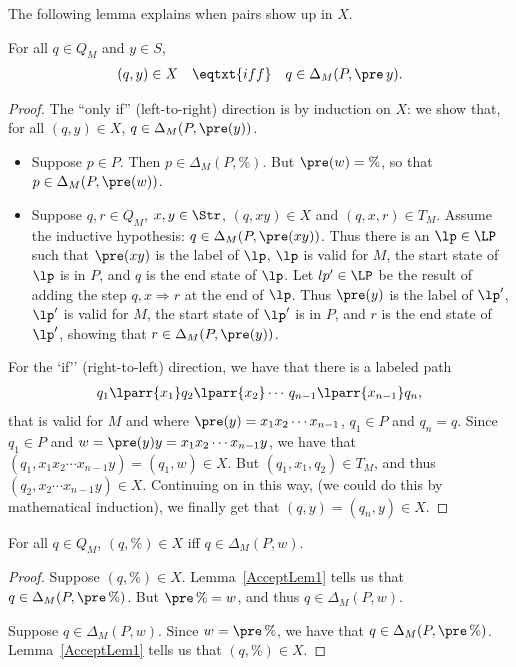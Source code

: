 The following lemma explains when pairs show up in $X$.

\begin{lemma}
\label{AcceptLem1}
For all $q\in Q_M$ and $y\in S$,
\begin{gather*}
(q,y)\in X\quad\eqtxt{iff}\quad q\in\Delta_M(P,\pre\,y) .
\end{gather*}
\end{lemma}

\begin{proof}
The ``only if'' (left-to-right) direction is by induction on $X$:
we show that, for all $(q,y)\in X$, $q\in\Delta_M(P,\pre(y))$.
\begin{itemize}
\item Suppose $p\in P$.  Then $p\in\Delta_M(P,\%)$.  But
$\pre(w)=\%$, so that $p\in\Delta_M(P,\pre(w))$.

\item Suppose $q,r\in Q_M$, $x,y\in\Str$, $(q,xy)\in X$ and
$(q,x,r)\in T_M$.  Assume the inductive hypothesis:
$q\in\Delta_M(P,\pre(xy))$.
Thus there is an $\lp\in\LP$
such that $\pre(xy)$ is the label of $\lp$, $\lp$ is valid for $M$,
the start state of $\lp$ is in $P$, and $q$ is the end state of $\lp$.
Let $lp'\in\LP$ be the result of adding the step $q,x\Rightarrow r$ at
the end of $\lp$.  Thus $\pre(y)$ is the label of $\lp'$, $\lp'$ is
valid for $M$, the start state of $\lp'$ is in $P$, and $r$ is the end
state of $\lp'$, showing that $r\in\Delta_M(P,\pre(y))$.
\end{itemize}

For the `if'' (right-to-left) direction, we have that there is a
labeled path
\begin{gather*}
q_1\lparr{x_1}q_2\lparr{x_2}\cdots\,q_{n-1}\lparr{x_{n-1}}q_n ,
\end{gather*}
that is valid for $M$ and where $\pre(y)=x_1x_2\cdots x_{n-1}$,
$q_1\in P$ and $q_n=q$.  Since $q_1\in P$ and $w=\pre(y)y=x_1x_2\cdots
x_{n-1}y$, we have that $(q_1, x_1x_2\cdots x_{n-1}y)=(q_1,w)\in X$.  But
$(q_1,x_1,q_2)\in T_M$, and thus $(q_2, x_2\cdots x_{n-1}y)\in X$.
Continuing on in this way, (we could do this by mathematical induction),
we finally get that $(q,y)=(q_n,y)\in X$.
\end{proof}

\begin{lemma}
\label{AcceptLem2}
For all $q\in Q_M$, $(q,\%)\in X$ iff $q\in\Delta_M(P,w)$.
\end{lemma}

\begin{proof}
Suppose $(q,\%)\in X$.  Lemma~\ref{AcceptLem1} tells us that
$q\in\Delta_M(P,\pre\,\%)$.  But $\pre\,\%=w$, and thus
$q\in\Delta_M(P,w)$.

Suppose $q\in\Delta_M(P,w)$.  Since $w=\pre\,\%$, we have that
$q\in\Delta_M(P,\pre\,\%)$.  Lemma~\ref{AcceptLem1} tells us that
$(q,\%)\in X$.
\end{proof}

